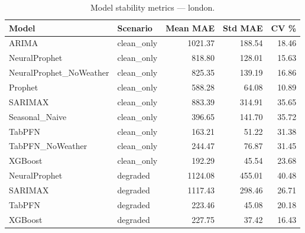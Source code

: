 \begin{table}[h]
\centering
\caption{Model stability metrics — london.}
\label{tab:stability_london}
\begin{tabular}{llrrr}
\toprule
Model & Scenario & Mean MAE & Std MAE & CV \% \\
\midrule
ARIMA & clean\_only & 1021.37 & 188.54 & 18.46 \\
NeuralProphet & clean\_only & 818.80 & 128.01 & 15.63 \\
NeuralProphet_NoWeather & clean\_only & 825.35 & 139.19 & 16.86 \\
Prophet & clean\_only & 588.28 & 64.08 & 10.89 \\
SARIMAX & clean\_only & 883.39 & 314.91 & 35.65 \\
Seasonal_Naive & clean\_only & 396.65 & 141.70 & 35.72 \\
TabPFN & clean\_only & 163.21 & 51.22 & 31.38 \\
TabPFN_NoWeather & clean\_only & 244.47 & 76.87 & 31.45 \\
XGBoost & clean\_only & 192.29 & 45.54 & 23.68 \\
NeuralProphet & degraded & 1124.08 & 455.01 & 40.48 \\
SARIMAX & degraded & 1117.43 & 298.46 & 26.71 \\
TabPFN & degraded & 223.46 & 45.08 & 20.18 \\
XGBoost & degraded & 227.75 & 37.42 & 16.43 \\
\bottomrule
\end{tabular}
\end{table}
